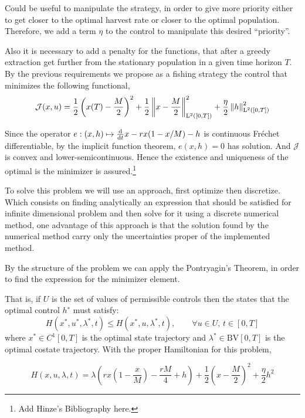 Could be useful to manipulate the strategy, in order to give more priority either to get closer to the optimal harvest rate or closer to the optimal population. Therefore, we add a term $\eta$ to the control to manipulate this desired ``priority''. 

Also it is necessary to add a penalty for the functions, that after a greedy extraction get further from the stationary population in a given time horizon $T$. By the previous requirements we propose as a fishing strategy the control that minimizes the following  functional,
\begin{equation}
\mathcal{J}(x,u)=\frac{1}{2} \left(x(T)-\frac{M}{2}\right)^2+\frac{1}{2}\left\lVert x-\frac{M}{2} \right\rVert^2_{\mathrm{L}^2([0,T])}+\frac{\eta}{2}\left\lVert h \right\rVert^2_{\mathrm{L}^2([0,T])}
\end{equation}

Since the operator $e:(x,h)\mapsto\frac{\mathrm{d} }{{\mathrm{d} t}}x-rx(1-x/M)-h$ is continuous Fr\'echet differentiable, by the implicit function theorem, $e(x,h)=0$ has solution. And $\mathcal{J}$ is convex and lower-semicontinuous. Hence the existence and uniqueness of the optimal is the minimizer is assured.\footnote{Add Hinze's Bibliography here.}

To solve this problem we will use an approach, first optimize then discretize. Which consists on finding analytically an expression that should be satisfied for infinite dimensional problem and then solve for it using a discrete numerical method, one advantage of this approach is that the solution found by the numerical method carry only the uncertainties proper of the implemented method. 


By the structure of the problem we can apply the Pontryagin's Theorem, in order to find the expression for the minimizer element.

That is, if $U$ is the set of values of permissible controls then the states that the optimal control $h^∗$ must satisfy:
\begin{equation}
H\left( x^*, u^*, \lambda^*, t \right) \leq H(x^*,u, \lambda^*, t), \qquad \forall u \in U,\, t \in [0, T]	\label{eq: HamiltonianOptimalCondition.}
\end{equation}	
where $x^* \in C^1[0, T]$ is the optimal state trajectory and $\lambda^* \in \mathrm{BV}[0, T]$ is the optimal costate trajectory. With the proper Hamiltonian for this problem,

\begin{equation}
H\left( x, u, \lambda, t \right)=\lambda\left(	rx\left(1-\frac{x}{M}\right)-\frac{rM}{4}+h\right)+\frac{1}{2}\left(x-\frac{M}{2}\right)^2+\frac{\eta}{2}h^2
\end{equation}

